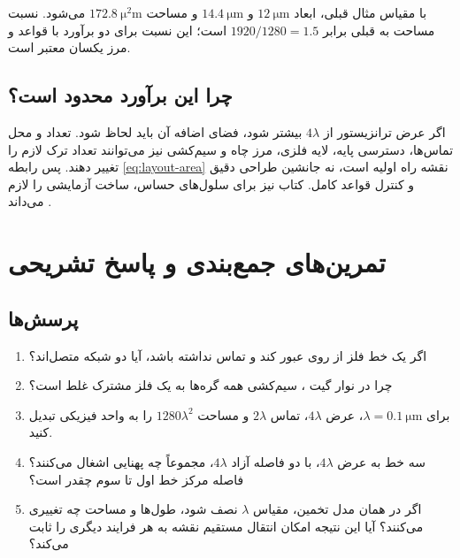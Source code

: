 با مقیاس مثال قبلی، ابعاد \(\qty{12}{\micro\metre}\) و
\(\qty{14.4}{\micro\metre}\) و مساحت
\(\qty{172.8}{\square\micro\metre}\) می‌شود.
نسبت مساحت به  قبلی برابر \(1920/1280=1.5\) است؛
این نسبت برای دو برآورد با قواعد و مرز یکسان معتبر است.

\subsection{چرا این برآورد محدود است؟}
اگر عرض ترانزیستور از \(4\lambda\) بیشتر شود، فضای اضافه آن باید لحاظ شود.
تعداد و محل تماس‌ها، دسترسی پایه، لایه فلزی، مرز چاه و سیم‌کشی نیز
می‌توانند تعداد ترک لازم را تغییر دهند.
پس رابطه \eqref{eq:layout-area} نقشه راه اولیه است، نه جانشین طراحی دقیق
و کنترل قواعد کامل. کتاب نیز برای سلول‌های حساس، ساخت آزمایشی 
را لازم می‌داند \cite[ابتدای صفحه چاپی ۲۹]{weste}.

\section{تمرین‌های جمع‌بندی و پاسخ تشریحی}
\subsection{پرسش‌ها}
\begin{enumerate}
\item اگر یک خط فلز از روی  عبور کند و تماس نداشته باشد، آیا دو شبکه متصل‌اند؟
\item چرا در نوار  گیت ، سیم‌کشی همه گره‌ها به یک فلز مشترک غلط است؟
\item برای \(\lambda=\qty{0.1}{\micro\metre}\)، عرض \(4\lambda\)،
تماس \(2\lambda\) و مساحت \(1280\lambda^2\) را به واحد فیزیکی تبدیل کنید.
\item سه خط  به عرض \(4\lambda\)، با دو فاصله آزاد
\(4\lambda\)، مجموعاً چه پهنایی اشغال می‌کنند؟ فاصله مرکز خط اول تا سوم چقدر است؟
\item اگر در همان مدل تخمین، مقیاس \(\lambda\) نصف شود، طول‌ها و مساحت چه تغییری می‌کنند؟
آیا این نتیجه امکان انتقال مستقیم نقشه به هر فرایند دیگری را ثابت می‌کند؟
\end{enumerate}

